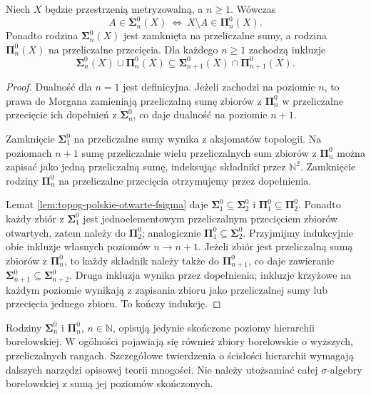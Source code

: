 \begin{stwierdzenie}
\label{prop:topog-polskie-hierarchia-wlasnosci}
Niech $X$ będzie przestrzenią
metryzowalną, a $n\ge1$.
Wówczas
\[
A\in\boldsymbol\Sigma^0_n(X)
\ \Longleftrightarrow\
X\setminus A\in\boldsymbol\Pi^0_n(X).
\]
Ponadto rodzina
$\boldsymbol\Sigma^0_n(X)$
jest zamknięta na przeliczalne
sumy, a rodzina
$\boldsymbol\Pi^0_n(X)$
na przeliczalne przecięcia.
Dla każdego $n\ge1$
zachodzą inkluzje
\[
\boldsymbol\Sigma^0_n(X)
\cup\boldsymbol\Pi^0_n(X)
\subseteq
\boldsymbol\Sigma^0_{n+1}(X)
\cap\boldsymbol\Pi^0_{n+1}(X).
\]
\end{stwierdzenie}
\begin{proof}
Dualność dla $n=1$
jest definicyjna.
Jeżeli zachodzi na poziomie $n$,
to prawa de Morgana zamieniają
przeliczalną sumę zbiorów
z $\boldsymbol\Pi^0_n$
w przeliczalne przecięcie
ich dopełnień z
$\boldsymbol\Sigma^0_n$,
co daje dualność na poziomie
$n+1$.

Zamknięcie $\boldsymbol\Sigma^0_1$
na przeliczalne sumy
wynika z aksjomatów topologii.
Na poziomach $n+1$ sumę
przeliczalnie wielu przeliczalnych
sum zbiorów z
$\boldsymbol\Pi^0_n$
można zapisać jako jedną
przeliczalną sumę, indeksując
składniki przez $\mathbb N^2$.
Zamknięcie rodziny
$\boldsymbol\Pi^0_n$ na
przeliczalne przecięcia
otrzymujemy przez dopełnienia.

Lemat
\ref{lem:topog-polskie-otwarte-fsigma}
daje
$\boldsymbol\Sigma^0_1
\subseteq\boldsymbol\Sigma^0_2$
i
$\boldsymbol\Pi^0_1
\subseteq\boldsymbol\Pi^0_2$.
Ponadto każdy zbiór z
$\boldsymbol\Sigma^0_1$ jest
jednoelementowym przeliczalnym
przecięciem zbiorów otwartych,
zatem należy do
$\boldsymbol\Pi^0_2$;
analogicznie
$\boldsymbol\Pi^0_1
\subseteq\boldsymbol\Sigma^0_2$.
Przyjmijmy indukcyjnie obie
inkluzje własnych poziomów
$n\to n+1$.
Jeżeli zbiór jest przeliczalną
sumą zbiorów z
$\boldsymbol\Pi^0_n$, to
każdy składnik należy także do
$\boldsymbol\Pi^0_{n+1}$,
co daje zawieranie
$\boldsymbol\Sigma^0_{n+1}
\subseteq\boldsymbol\Sigma^0_{n+2}$.
Druga inkluzja wynika przez
dopełnienia; inkluzje krzyżowe
na każdym poziomie wynikają
z zapisania zbioru jako
przeliczalnej sumy lub
przecięcia jednego zbioru.
To kończy indukcję.
\end{proof}

\begin{uwaga}
Rodziny
$\boldsymbol\Sigma^0_n$
i $\boldsymbol\Pi^0_n$,
$n\in\mathbb N$, opisują
jedynie skończone poziomy
hierarchii borelowskiej.
W ogólności pojawiają się
również zbiory borelowskie
o wyższych, przeliczalnych
rangach. Szczegółowe twierdzenia
o ścisłości hierarchii wymagają
dalszych narzędzi opisowej teorii
mnogości.
Nie należy utożsamiać całej
$\sigma$-algebry borelowskiej
z sumą jej poziomów skończonych.
\end{uwaga}

